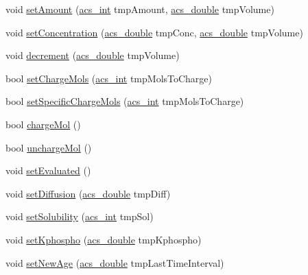 \begin{DoxyCompactItemize}
\item 
void \hyperlink{classspecies_abefdc30b6f352e5ce5576a610015f5b8}{set\-Amount} (\hyperlink{acs__headers_8h_a8d277355641a098190360234e2ebde35}{acs\-\_\-int} tmp\-Amount, \hyperlink{acs__headers_8h_ab776853a005fcbf56af0424a2a4dd607}{acs\-\_\-double} tmp\-Volume)
\item 
void \hyperlink{classspecies_a018a8f55746849f4814b4d281d4aca5a}{set\-Concentration} (\hyperlink{acs__headers_8h_ab776853a005fcbf56af0424a2a4dd607}{acs\-\_\-double} tmp\-Conc, \hyperlink{acs__headers_8h_ab776853a005fcbf56af0424a2a4dd607}{acs\-\_\-double} tmp\-Volume)
\item 
void \hyperlink{classspecies_ae5142c6ab199459bc1d7d5945c761f0e}{decrement} (\hyperlink{acs__headers_8h_ab776853a005fcbf56af0424a2a4dd607}{acs\-\_\-double} tmp\-Volume)
\item 
bool \hyperlink{classspecies_a27f9852312659597efe7925124152286}{set\-Charge\-Mols} (\hyperlink{acs__headers_8h_a8d277355641a098190360234e2ebde35}{acs\-\_\-int} tmp\-Mols\-To\-Charge)
\item 
bool \hyperlink{classspecies_a088763fc6b6279040920d219f314c90e}{set\-Specific\-Charge\-Mols} (\hyperlink{acs__headers_8h_a8d277355641a098190360234e2ebde35}{acs\-\_\-int} tmp\-Mols\-To\-Charge)
\item 
bool \hyperlink{classspecies_adc36fb991695aed6503b8ed82e06bca5}{charge\-Mol} ()
\item 
bool \hyperlink{classspecies_acf8588148932adb86229eec28f7cde7c}{uncharge\-Mol} ()
\item 
void \hyperlink{classspecies_a089da38f8016bd588fa262cd836d1c4d}{set\-Evaluated} ()
\item 
void \hyperlink{classspecies_ab4b4adbc3c26e3a8c81a090c9d1330e3}{set\-Diffusion} (\hyperlink{acs__headers_8h_ab776853a005fcbf56af0424a2a4dd607}{acs\-\_\-double} tmp\-Diff)
\item 
void \hyperlink{classspecies_a27c2d0448e1f56e0962132d8d360fc07}{set\-Solubility} (\hyperlink{acs__headers_8h_a8d277355641a098190360234e2ebde35}{acs\-\_\-int} tmp\-Sol)
\item 
void \hyperlink{classspecies_a4d33fdb252e1884841f9c671ce25973c}{set\-Kphospho} (\hyperlink{acs__headers_8h_ab776853a005fcbf56af0424a2a4dd607}{acs\-\_\-double} tmp\-Kphospho)
\item 
void \hyperlink{classspecies_aa73ab15fb28aefd3b0c6b19e7c9bb944}{set\-New\-Age} (\hyperlink{acs__headers_8h_ab776853a005fcbf56af0424a2a4dd607}{acs\-\_\-double} tmp\-Last\-Time\-Interval)
\item 

\end{DoxyCompactItemize}
